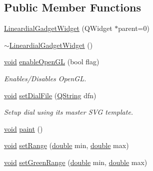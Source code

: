 \subsection*{Public Member Functions}
\begin{DoxyCompactItemize}
\item 
\hyperlink{group___linear_dial_plugin_ga67af774f5fa476bda0dce880d57348a7}{Lineardial\-Gadget\-Widget} (Q\-Widget $\ast$parent=0)
\item 
\hyperlink{group___linear_dial_plugin_ga46b2275fc21a5a5fc14809f31be48674}{$\sim$\-Lineardial\-Gadget\-Widget} ()
\item 
\hyperlink{group___u_a_v_objects_plugin_ga444cf2ff3f0ecbe028adce838d373f5c}{void} \hyperlink{group___linear_dial_plugin_ga6963a6b647b9d9def0497b60df89d576}{enable\-Open\-G\-L} (bool flag)
\begin{DoxyCompactList}\small\item\em Enables/\-Disables Open\-G\-L. \end{DoxyCompactList}\item 
\hyperlink{group___u_a_v_objects_plugin_ga444cf2ff3f0ecbe028adce838d373f5c}{void} \hyperlink{group___linear_dial_plugin_ga5242e6b2ecad5fb0d80b13f5e989c671}{set\-Dial\-File} (\hyperlink{group___u_a_v_objects_plugin_gab9d252f49c333c94a72f97ce3105a32d}{Q\-String} dfn)
\begin{DoxyCompactList}\small\item\em Setup dial using its master S\-V\-G template. \end{DoxyCompactList}\item 
\hyperlink{group___u_a_v_objects_plugin_ga444cf2ff3f0ecbe028adce838d373f5c}{void} \hyperlink{group___linear_dial_plugin_ga90222159d9de45fe9f4321c30e3f536a}{paint} ()
\item 
\hyperlink{group___u_a_v_objects_plugin_ga444cf2ff3f0ecbe028adce838d373f5c}{void} \hyperlink{group___linear_dial_plugin_ga659bce00c419425ed6e5e03095b06e3c}{set\-Range} (\hyperlink{_super_l_u_support_8h_a8956b2b9f49bf918deed98379d159ca7}{double} min, \hyperlink{_super_l_u_support_8h_a8956b2b9f49bf918deed98379d159ca7}{double} max)
\item 
\hyperlink{group___u_a_v_objects_plugin_ga444cf2ff3f0ecbe028adce838d373f5c}{void} \hyperlink{group___linear_dial_plugin_ga46b699d52d4dea2d6b6ff2b37a5657b0}{set\-Green\-Range} (\hyperlink{_super_l_u_support_8h_a8956b2b9f49bf918deed98379d159ca7}{double} min, \hyperlink{_super_l_u_support_8h_a8956b2b9f49bf918deed98379d159ca7}{double} max)
\item 

\end{DoxyCompactItemize}
